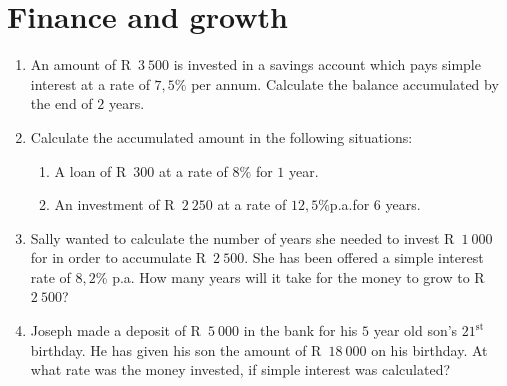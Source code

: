\chapter{Finance and growth}
\begin{exercises}{}{
    \begin{enumerate}[itemsep=6pt, label=\textbf{\arabic*}.]
	\item An amount of R~$3~500$ is invested in a savings account which pays simple interest at a rate of $7,5\%$ per annum. Calculate the balance accumulated by the end of $2$ years.
	\item Calculate the accumulated amount in the following situations:
	\begin{enumerate}[noitemsep, label=\textbf{(\alph*)} ]
	    \item A loan of R~$300$ at a rate of $8\%$ for $1$ year.
	    \item An investment of R~$2~250$ at a rate of $12,5\%$p.a.\@ for $6$ years.
	\end{enumerate}
	\item Sally wanted to calculate the number of years she needed to invest R~$1~000$ for in order to accumulate R~$2~500$. She has been offered a simple interest rate of $8,2\%$ p.a. How many years will it take for the money to grow to R~$2~500$?
	\item Joseph made a deposit of R~$5~000$ in the bank for his $5$ year old son's $21^{\mbox{st}}$ birthday. He has given his son the amount of R~$18~000$ on his birthday. At what rate was the money invested, if simple interest was calculated?
    \end{enumerate}
}
\end{exercises}


